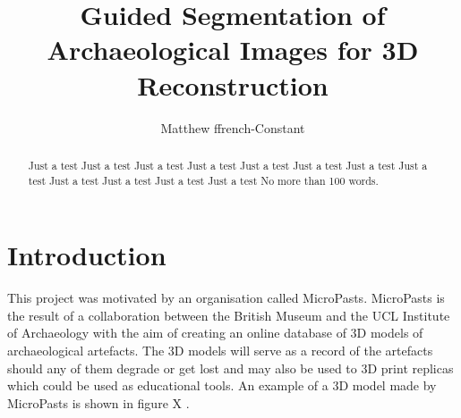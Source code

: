 \documentclass[12pt]{IIBproject}
\begin{document}
\author{Matthew ffrench-Constant}
\title{Guided Segmentation of Archaeological Images for
3D Reconstruction}
\maketitle
\thispagestyle{empty}



\begin{abstract}
Just a test Just a test Just a test Just a test Just a test Just a test 
Just a test Just a test Just a test Just a test Just a test Just a test 
No more than 100 words.
\end{abstract}
\pagestyle{plain}
\tableofcontents
\newpage














\section{Introduction}

This project was motivated by an organisation called MicroPasts\cite{micropasts}. MicroPasts is the result of a collaboration between the British Museum and the UCL Institute of Archaeology with the aim of creating an online database of 3D models of archaeological artefacts. The 3D models will serve as a record of the artefacts should any of them degrade or get lost and may also be used to 3D print replicas which could be used as educational tools. An example of a 3D model made by MicroPasts is shown in figure X \cite{jugModel}.
\end{document}
